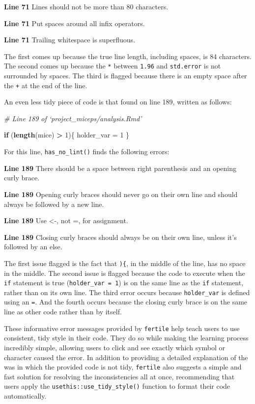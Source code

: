 \documentclass[12pt,twoside]{reedthesis}
\newenvironment{Shaded}{\begin{snugshade}}{\end{snugshade}}
\newcommand{\KeywordTok}[1]{\textcolor[rgb]{0.13,0.29,0.53}{\textbf{#1}}}
\newcommand{\DecValTok}[1]{\textcolor[rgb]{0.00,0.00,0.81}{#1}}
\newcommand{\StringTok}[1]{\textcolor[rgb]{0.31,0.60,0.02}{#1}}
\newcommand{\CommentTok}[1]{\textcolor[rgb]{0.56,0.35,0.01}{\textit{#1}}}
\newcommand{\ControlFlowTok}[1]{\textcolor[rgb]{0.13,0.29,0.53}{\textbf{#1}}}
\newcommand{\OperatorTok}[1]{\textcolor[rgb]{0.81,0.36,0.00}{\textbf{#1}}}
\newcommand{\NormalTok}[1]{#1}
\begin{document}
\textbf{Line 71} Lines should not be more than 80 characters.

\textbf{Line 71} Put spaces around all infix operators.

\textbf{Line 71} Trailing whitespace is superfluous.

The first comes up because the true line length, including spaces, is 84
characters. The second comes up because the \texttt{*} between
\texttt{1.96} and \texttt{std.error} is not surrounded by spaces. The
third is flagged because there is an empty space after the \texttt{+} at
the end of the line.

An even less tidy piece of code is that found on line 189, written as
follows:
\begin{Shaded}
\begin{Highlighting}[]
\CommentTok{# Line 189 of `project_miceps/analysis.Rmd'}

\ControlFlowTok{if}\NormalTok{ (}\KeywordTok{length}\NormalTok{(mice) }\OperatorTok{>}\StringTok{ }\DecValTok{1}\NormalTok{)\{ holder_var =}\StringTok{ }\DecValTok{1}\NormalTok{ \}}
\end{Highlighting}
\end{Shaded}
For this line, \texttt{has\_no\_lint()} finds the following errors:

\textbf{Line 189} There should be a space between right parenthesis and
an opening curly brace.

\textbf{Line 189} Opening curly braces should never go on their own line
and should always be followed by a new line.

\textbf{Line 189} Use \textless{}-, not =, for assignment.

\textbf{Line 189} Closing curly braces should always be on their own
line, unless it's followed by an else.

The first issue flagged is the fact that \texttt{)\{}, in the middle of
the line, has no space in the middle. The second issue is flagged
because the code to execute when the \texttt{if} statement is true
(\texttt{holder\_var\ =\ 1}) is on the same line as the \texttt{if}
statement, rather than on its own line. The third error occurs because
\texttt{holder\_var} is defined using an \texttt{=}. And the fourth
occurs because the closing curly brace is on the same line as other code
rather than by itself.

These informative error messages provided by \texttt{fertile} help teach
users to use consistent, tidy style in their code. They do so while
making the learning process incredibly simple, allowing users to click
and see exactly which symbol or character caused the error. In addition
to providing a detailed explanation of the was in which the provided
code is not tidy, \texttt{fertile} also suggests a simple and fast
solution for resolving the inconsistencies all at once, recommending
that users apply the \texttt{usethis::use\_tidy\_style()} function to
format their code automatically.
\end{document}
